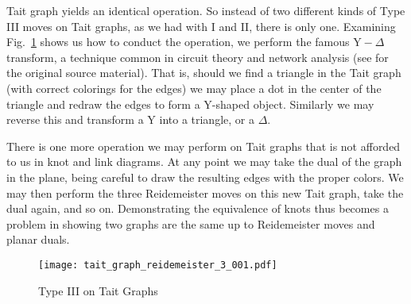         Tait graph yields an identical operation. So instead of two different
        kinds of Type III moves on Tait graphs, as we had with I and II,
        there is only one. Examining
        Fig.~\ref{fig:tait_graph_reidemeister_3_001} shows us how to conduct
        the operation, we perform the famous
        $\textrm{Y}-\Delta$ transform, a technique common in circuit theory
        and network analysis (see \cite{KennellyYDelta} for the original
        source material). That is, should we find a triangle in the Tait
        graph (with correct colorings for the edges) we may place a dot in the
        center of the triangle and redraw the edges to form a
        $\textrm{Y}$-shaped object. Similarly we may reverse this and transform
        a $\textrm{Y}$ into a triangle, or a $\Delta$.
        \par\hfill\par
        There is one more operation we may perform on Tait graphs that is not
        afforded to us in knot and link diagrams. At any point we may take the
        dual of the graph in the plane, being careful to draw the resulting
        edges with the proper colors. We may then perform the three
        Reidemeister moves on this new Tait graph, take the dual again, and
        so on. Demonstrating the equivalence of knots thus becomes a problem
        in showing two graphs are the same up to Reidemeister moves and planar
        duals.
        \begin{figure}
            \centering
            \texttt{[image: tait\_graph\_reidemeister\_3\_001.pdf]}
            \caption{Type III on Tait Graphs}
            \label{fig:tait_graph_reidemeister_3_001}
        \end{figure}
